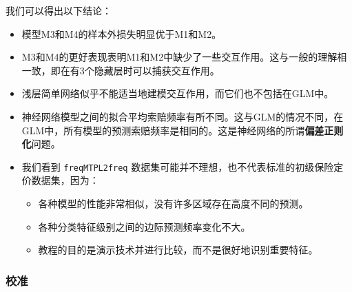 \documentclass[
]{article}
\providecommand{\tightlist}{%
  \setlength{\itemsep}{0pt}\setlength{\parskip}{0pt}}
\begin{document}
我们可以得出以下结论：

\begin{itemize}
\tightlist
\item
  模型M3和M4的样本外损失明显优于M1和M2。
\item
  M3和M4的更好表现表明M1和M2中缺少了一些交互作用。这与一般的理解相一致，即在有3个隐藏层时可以捕获交互作用。
\item
  浅层简单网络似乎不能适当地建模交互作用，而它们也不包括在GLM中。
\item
  神经网络模型之间的拟合平均索赔频率有所不同。这与GLM的情况不同，在GLM中，所有模型的预测索赔频率是相同的。这是神经网络的所谓\textbf{偏差正则化}问题。
\item
  我们看到 \texttt{freqMTPL2freq}
  数据集可能并不理想，也不代表标准的初级保险定价数据集，因为：

  \begin{itemize}
  \tightlist
  \item
    各种模型的性能非常相似，没有许多区域存在高度不同的预测。
  \item
    各种分类特征级别之间的边际预测频率变化不大。
  \item
    教程的目的是演示技术并进行比较，而不是很好地识别重要特征。
  \end{itemize}
\end{itemize}

\subsubsection{校准}\label{ux6821ux51c6}
\end{document}
